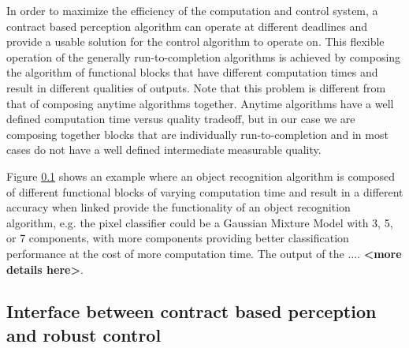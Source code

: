 In order to maximize the efficiency of the computation and control system, a contract based perception algorithm can operate at different deadlines and provide a usable solution for the control algorithm to operate on. This flexible operation of the generally run-to-completion algorithms is achieved by composing the algorithm of functional blocks that have different computation times and result in different qualities of outputs. Note that this problem is different from that of composing anytime algorithms together. Anytime algorithms have a well defined computation time versus quality tradeoff, but in our case we are composing together blocks that are individually run-to-completion and in most cases do not have a well defined intermediate measurable quality.

Figure \ref{} shows an example where an object recognition algorithm is composed of different functional blocks of varying computation time and result in a different accuracy when linked provide the functionality of an object recognition algorithm, e.g. the pixel classifier could be a Gaussian Mixture Model with 3, 5, or 7 components, with more components providing better classification performance at the cost of more computation time. The output of the .... \textbf{<more details here>}.






\subsection{Interface between contract based perception and robust control}

